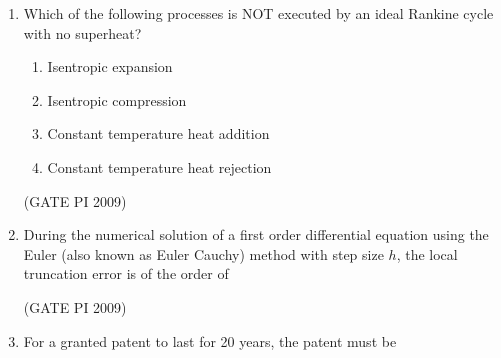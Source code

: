 \documentclass[journal,12pt,onecolumn]{IEEEtran}
\theoremstyle{remark}
\begin{document}
\begin{enumerate}
\begin{enumerate}
\begin{multicols}{2}
\end{multicols}
\end{enumerate}
\hfill (GATE PI 2009)
\item Which of the following processes is NOT executed by an ideal Rankine cycle with no superheat?
\begin{enumerate}
\item Isentropic expansion
\item Isentropic compression
\item Constant temperature heat addition
\item Constant temperature heat rejection
\end{enumerate}
\hfill (GATE PI 2009)
\item During the numerical solution of a first order differential equation using the Euler (also known as Euler Cauchy) method with step size $h$, the local truncation error is of the order of
\begin{enumerate}
\end{enumerate}
\hfill (GATE PI 2009)
\item For a granted patent to last for 20 years, the patent must be
\begin{enumerate}
\end{enumerate}


\end{enumerate}
\end{document}
